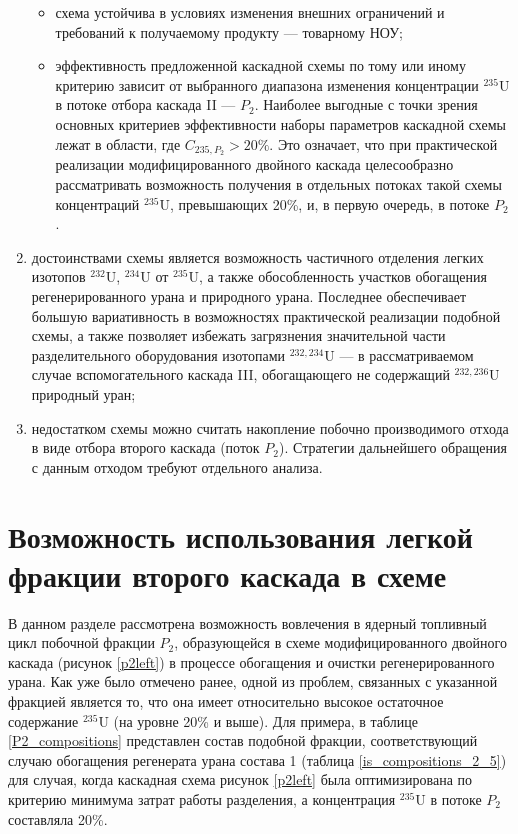 \begin{enumerate}
\begin{itemize}
        \item схема устойчива в условиях изменения внешних ограничений и требований к получаемому продукту --- товарному НОУ;
        \item эффективность предложенной каскадной схемы по тому или иному критерию зависит от выбранного диапазона изменения концентрации $^{235}$U в потоке отбора каскада II --- $P_2$. Наиболее выгодные с точки зрения основных критериев эффективности наборы параметров каскадной схемы лежат в области, где $C_{235,{P_2}} > 20\%$. Это означает, что при практической реализации модифицированного двойного каскада целесообразно рассматривать возможность получения в отдельных потоках такой схемы концентраций $^{235}$U, превышающих 20\%, и, в первую очередь, в потоке $P_2$.
    \end{itemize}   
    \item достоинствами схемы является возможность частичного отделения легких изотопов $^{232}$U, $^{234}$U от $^{235}$U, а также обособленность участков обогащения регенерированного урана и природного урана. Последнее обеспечивает большую вариативность в возможностях практической реализации подобной схемы, а также позволяет избежать загрязнения значительной части разделительного оборудования изотопами $^{232,234}$U --- в рассматриваемом случае вспомогательного каскада III, обогащающего не содержащий $^{232,236}$U природный уран;
    \item недостатком схемы можно считать накопление побочно производимого отхода в виде отбора второго каскада (поток $P_2$). Стратегии дальнейшего обращения с данным отходом требуют отдельного анализа.
\end{enumerate}


\section{Возможность использования легкой фракции второго каскада в схеме}

В данном разделе рассмотрена возможность вовлечения в ядерный топливный цикл побочной фракции $P_2$, образующейся в схеме модифицированного двойного каскада (рисунок \ref{p2left}) в процессе обогащения и очистки регенерированного урана. Как уже было отмечено ранее, одной из проблем, связанных с указанной фракцией является то, что она имеет относительно высокое остаточное содержание $^{235}$U (на уровне 20\% и выше). Для примера, в таблице \ref{P2_compositions} представлен состав подобной фракции, соответствующий случаю обогащения регенерата урана состава 1 (таблица \ref{is_compositions_2_5}) для случая, когда каскадная схема рисунок \ref{p2left} была оптимизирована по критерию минимума затрат работы разделения, а концентрация $^{235}$U в потоке $P_2$ составляла 20\%. 

